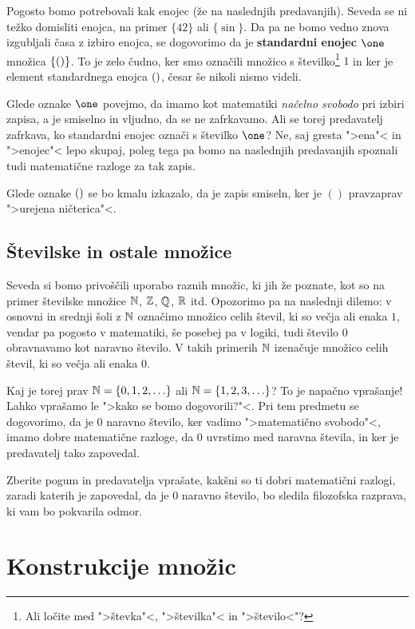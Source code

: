 Pogosto bomo potrebovali kak enojec (že na naslednjih predavanjih). Seveda se ni težko domisliti enojca, na primer $\{42\}$ ali $\{\sin\}$. Da pa ne bomo vedno znova izgubljali časa z izbiro enojca, se dogovorimo da je \textbf{standardni enojec $\one$} množica $\{()\}$. To je zelo čudno, ker smo označili množico s številko\footnote{Ali ločite med ">števka"<, ">številka"< in ">število<"?} $1$ in ker je element standardnega enojca $()$, česar še nikoli nismo videli.

Glede oznake $\one$ povejmo, da imamo kot matematiki \emph{načelno svobodo} pri izbiri zapisa, a je smiselno in vljudno, da se ne zafrkavamo. Ali se torej predavatelj zafrkava, ko standardni enojec označi s številko $\one$? Ne, saj gresta ">ena"< in ">enojec"< lepo skupaj, poleg tega pa bomo na naslednjih predavanjih spoznali tudi matematične razloge za tak zapis.

Glede oznake $()$ se bo kmalu izkazalo, da je zapis smiseln, ker je $()$ pravzaprav ">urejena ničterica"<.

\subsection{Številske in ostale množice}

Seveda si bomo privoščili uporabo raznih množic, ki jih že poznate, kot so na primer številske množice $\mathbb{N}$, $\mathbb{Z}$, $\mathbb{Q}$, $\mathbb{R}$ itd. Opozorimo pa na naslednji dilemo:
v osnovni in srednji šoli z $\mathbb{N}$ označimo množico celih števil, ki so večja ali enaka $1$, vendar pa pogosto v matematiki, še posebej pa v logiki, tudi število $0$ obravnavamo kot naravno število. V takih primerih $\mathbb{N}$ izenačuje množico celih števil, ki so večja ali enaka $0$.

Kaj je torej prav $\mathbb{N} = \{0, 1, 2, \ldots\}$ ali $\mathbb{N} = \{1, 2, 3, \ldots\}$? To je napačno vprašanje! Lahko vprašamo le ">kako se bomo dogovorili?"<. Pri tem predmetu se
dogovorimo, da je $0$ naravno število, ker vadimo ">matematično svobodo"<, imamo dobre matematične razloge, da $0$ uvrstimo med naravna števila, in ker je predavatelj tako zapovedal.

\begin{naloga}
  Zberite pogum in predavatelja vprašate, kakšni so ti dobri matematični razlogi, zaradi katerih je zapovedal, da je $0$ naravno število, bo sledila filozofska razprava, ki vam bo pokvarila odmor.
\end{naloga}

\section{Konstrukcije množic}


